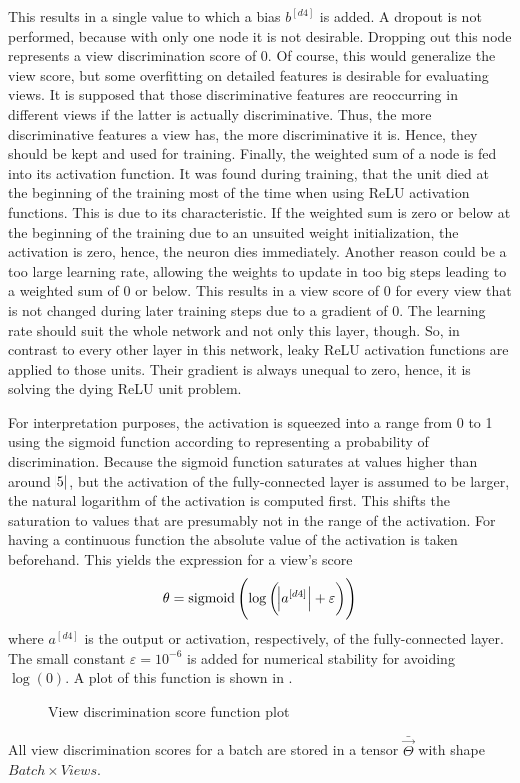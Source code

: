 This results in a single value to which a bias $b^{[d4]}$ is added.
A dropout is not performed, because with only one node it is not desirable.
Dropping out this node represents a view discrimination score of 0.
Of course, this would generalize the view score, but some overfitting on detailed features is desirable for evaluating views.
It is supposed that those discriminative features are reoccurring in different views if the latter is actually discriminative.
Thus, the more discriminative features a view has, the more discriminative it is.
Hence, they should be kept and used for training.
Finally, the weighted sum of a node is fed into its activation function.
It was found during training, that the unit died at the beginning of the training most of the time when using ReLU activation functions.
This is due to its characteristic.
If the weighted sum is zero or below at the beginning of the training due to an unsuited weight initialization, the activation is zero, hence, the neuron dies immediately.
Another reason could be a too large learning rate, allowing the weights to update in too big steps leading to a weighted sum of 0 or below.
This results in a view score of $0$ for every view that is not changed during later training steps due to a gradient of 0.
The learning rate should suit the whole network and not only this layer, though.
So, in contrast to every other layer in this network, leaky ReLU activation functions are applied to those units.
Their gradient is always unequal to zero, hence, it is solving the dying ReLU unit problem.

For interpretation purposes, the activation is squeezed into a range from 0 to 1 using the sigmoid function according to \cite{Feng2018} representing a probability of discrimination.
Because the sigmoid function saturates at values higher than around $\abs{5}$, but the activation of the fully-connected layer is assumed to be larger, the natural logarithm of the activation is computed first.
This shifts the saturation to values that are presumably not in the range of the activation.
For having a continuous function the absolute value of the activation is taken beforehand.
This yields the expression for a view's score
\begin{equation}
	\label{eq:view-discrimination-score}
	\theta = \operatorname{sigmoid}\left( \log \left( \abs{a^{[d4]}} + \varepsilon \right) \right)
\end{equation}
where $a^{[d4]}$ is the output or activation, respectively, of the fully-connected layer.
The small constant $\varepsilon=10^{-6}$ is added for numerical stability for avoiding $\log(0)$.
A plot of this function is shown in .
\begin{figure}
	\setlength{}
	\setlength{}
	\centering
	
	\caption{View discrimination score function plot}
	\label{fig:view-discrimination-score}
\end{figure}
All view discrimination scores for a batch are stored in a tensor $\bar{\vec{\Theta}}$ with shape $Batch \times Views$.

